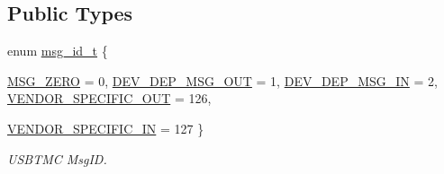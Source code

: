 \subsection*{Public Types}
\begin{DoxyCompactItemize}
\item 
enum \hyperlink{classmdt_frame_usb_tmc_a10c2216157b0616b69f6cabc5c8e253b}{msg\_\-id\_\-t} \{ \par
\hyperlink{classmdt_frame_usb_tmc_a10c2216157b0616b69f6cabc5c8e253ba5faf83c861e5c3ea0faa73d276b3cebd}{MSG\_\-ZERO} =  0, 
\hyperlink{classmdt_frame_usb_tmc_a10c2216157b0616b69f6cabc5c8e253bac179e40351460bf53a74d5654ae6a79e}{DEV\_\-DEP\_\-MSG\_\-OUT} =  1, 
\hyperlink{classmdt_frame_usb_tmc_a10c2216157b0616b69f6cabc5c8e253ba89fd5ab2298285f5a91e3b2f3822a7aa}{DEV\_\-DEP\_\-MSG\_\-IN} =  2, 
\hyperlink{classmdt_frame_usb_tmc_a10c2216157b0616b69f6cabc5c8e253bafb1be2ba00b4830e457e933e4497a593}{VENDOR\_\-SPECIFIC\_\-OUT} =  126, 
\par
\hyperlink{classmdt_frame_usb_tmc_a10c2216157b0616b69f6cabc5c8e253baf6fe219e0ce27a6a793db4b4a5c2a686}{VENDOR\_\-SPECIFIC\_\-IN} =  127
 \}
\begin{DoxyCompactList}\small\item\em USBTMC MsgID. \end{DoxyCompactList}\end{DoxyCompactItemize}
